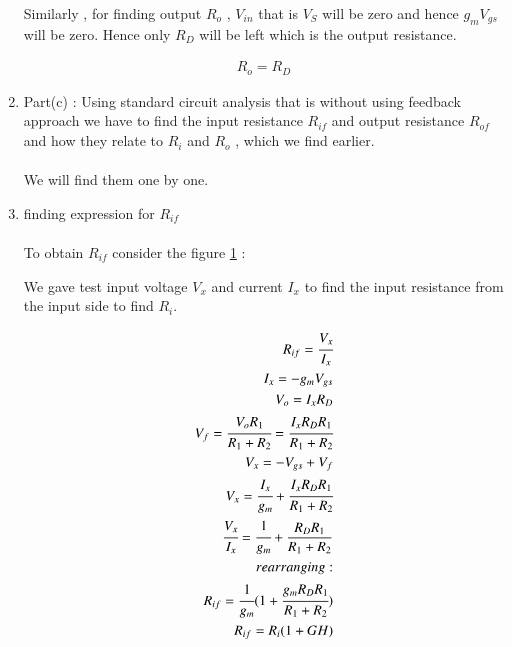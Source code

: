 \begin{enumerate}[label=\thesubsection.\arabic*.,ref=\thesubsection.\theenumi]
Similarly , for finding output $R_{o}$ , $V_{in}$ that is $V_{S}$ will be zero and hence $g_{m}V_{gs}$ will be zero. Hence only $R_{D}$ will 
be left which is the output resistance.

\begin{align}
R_{o}=R_{D}
\end{align}
\item Part(c) : Using standard circuit analysis that is without using feedback approach we have to find the input resistance $R_{if}$ and output resistance $R_{of}$ and how they relate to $R_{i}$ and $R_{o}$ , which we find earlier.\\
\solution \\
We will find them one by one.

\begin{figure}[ht!]
	\begin{center}
		\resizebox{\columnwidth}{!}{}
	\end{center}
	\caption{}
	\label{fig:Small signal for finding input resistance}
\end{figure}

\item finding expression for $R_{if}$\\
\solution\\

To obtain $R_{if}$ consider the figure \ref{fig:Small signal for finding input resistance} :



We gave test input voltage $V_{x}$ and current $I_{x}$ to find the input resistance from the input side to find $R_{i}$.

\begin{align}
R_{if} = \cfrac{V_{x}}{I_{x}}\\
I_{x} = -g_{m}V_{gs} \\
V_{o} = I_{x}R_{D}\\
V_{f} = \cfrac{V_{o}R_{1}}{R_{1}+R_{2}} = \cfrac{I_{x}R_{D}R_{1}}{R_{1}+R_{2}} \\
V_{x} = -V_{gs} + V_{f} \\
V_{x} = \cfrac{I_{x}}{g_{m}} + \cfrac{I_{x}R_{D}R_{1}}{R_{1}+R_{2}}\\
\cfrac{V_{x}}{I_{x}} =  \cfrac{1}{g_{m}} + \frac{R_{D}R_{1}}{R_{1}+R_{2}}\\
rearranging :\\
R_{if} =  \cfrac{1}{g_{m}}(1+\cfrac{g_{m}R_{D}R_{1}}{R_{1}+R_{2}})\\
R_{if} = R_{i}(1+GH)
\end{align}


\end{enumerate}
